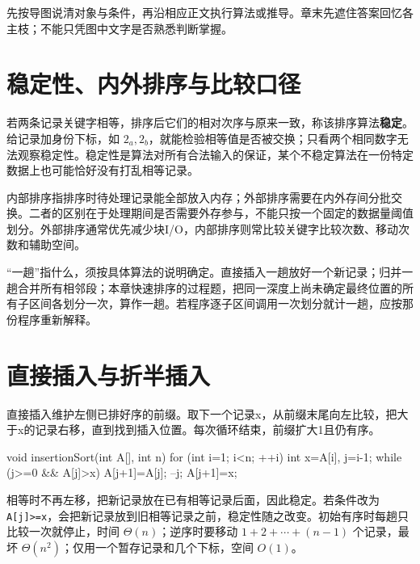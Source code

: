 先按导图说清对象与条件，再沿相应正文执行算法或推导。章末先遮住答案回忆各主枝；不能只凭图中文字是否熟悉判断掌握。

\section{稳定性、内外排序与比较口径}\label{DS08-01}

\begin{definition}[排序稳定性]

若两条记录关键字相等，排序后它们的相对次序与原来一致，称该排序算法\textbf{稳定}。给记录加身份下标，如 \(2_a,2_b\)，就能检验相等值是否被交换；只看两个相同数字无法观察稳定性。稳定性是算法对所有合法输入的保证，某个不稳定算法在一份特定数据上也可能恰好没有打乱相等记录。

\end{definition}

内部排序指排序时待处理记录能全部放入内存；外部排序需要在内外存间分批交换。二者的区别在于处理期间是否需要外存参与，不能只按一个固定的数据量阈值划分。外部排序通常优先减少块I/O，内部排序则常比较关键字比较次数、移动次数和辅助空间。

``一趟''指什么，须按具体算法的说明确定。直接插入一趟放好一个新记录；归并一趟合并所有相邻段；本章快速排序的过程题，把同一深度上尚未确定最终位置的所有子区间各划分一次，算作一趟。若程序逐子区间调用一次划分就计一趟，应按那份程序重新解释。

\section{直接插入与折半插入}\label{DS08-02}

直接插入维护左侧已排好序的前缀。取下一个记录x，从前缀末尾向左比较，把大于x的记录右移，直到找到插入位置。每次循环结束，前缀扩大1且仍有序。

\begin{codeblock}[language=C]
void insertionSort(int A[], int n) {
    for (int i=1; i<n; ++i) {
        int x=A[i], j=i-1;
        while (j>=0 && A[j]>x) {
            A[j+1]=A[j]; --j;
        }
        A[j+1]=x;
    }
}
\end{codeblock}

相等时不再左移，把新记录放在已有相等记录后面，因此稳定。若条件改为 \texttt{A[j]>\allowbreak{}=\allowbreak{}x}，会把新记录放到旧相等记录之前，稳定性随之改变。初始有序时每趟只比较一次就停止，时间 \(\Theta(n)\)；逆序时要移动 \(1+2+\cdots+(n-1)\) 个记录，最坏 \(\Theta(n^2)\)；仅用一个暂存记录和几个下标，空间 \(O(1)\)。

